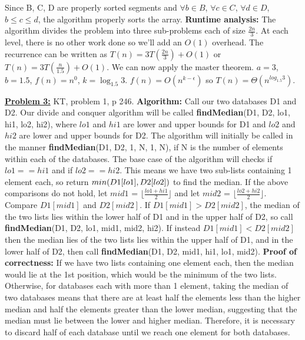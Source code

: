 \documentclass[11pt]{article}
\begin{document}
\begin{flushleft}
		\newline
		Since B, C, D are properly sorted segments and $\forall b \in B$, $\forall c \in C$, $\forall d \in D$, $b \leq c \leq d$, the algorithm properly sorts the array.
		\newline
		\textbf{Runtime analysis:} The algorithm divides the problem into three sub-problems each of size $\frac{2n}{3}$. At each level, there is no other work done so we'll add an $O(1)$ overhead. The recurrence can be written as $T(n) = 3T(\frac{2n}{3}) + O(1)$ or $T(n) = 3T(\frac{n}{1.5}) + O(1)$. We can now apply the master theorem. $a = 3$, $b = 1.5$, $f(n) = n^0$, $k = \log_{1.5}3$. $f(n) = O(n^{k - \epsilon})$ so $T(n) = \Theta(n^{log_{1.5}3})$.
		\newline
		\item \textbf {\underline{Problem 3:}} KT, problem 1, p 246.
		\newline
		\textbf{Algorithm:} Call our two databases D1 and D2. Our divide and conquer algorithm will be called \textbf{findMedian}(D1, D2, lo1, hi1, lo2, hi2), where $lo1$ and $hi1$ are lower and upper bounds for D1 and $lo2$ and $hi2$ are lower and upper bounds for D2. The algorithm will initially be called in the manner \textbf{findMedian}(D1, D2, 1, N, 1, N), if N is the number of elements within each of the databases. The base case of the algorithm will checks if $lo1 == hi1$ and if $lo2 == hi2$. This means we have two sub-lists containing 1 element each, so return $min(D1[lo1],\space D2[lo2])$ to find the median.
		\newline
		If the above comparisons do not hold, let $mid1$ = $\lfloor \frac{lo1 + hi1}{2} \rfloor$
		and let $mid2$ = $\lfloor \frac{lo2 + hi2}{2} \rfloor$. Compare $D1[mid1]$ and $D2[mid2]$. If $D1[mid1] > D2[mid2]$, the median of the two lists lies within the lower half of D1 and in the upper half of D2, so call 
		\textbf{findMedian}(D1, D2, lo1, mid1, mid2, hi2). 
		\newline
		If instead $D1[mid1] < D2[mid2]$ then the median lies of the two lists lies within the upper half of D1, and in the lower half of D2, then call \textbf{findMedian}(D1, D2, mid1, hi1, lo1, mid2). 
		\newline
		\newline
		\textbf{Proof of correctness:} If we have two lists containing one element each, then the median would lie at the 1st position, which would be the minimum of the two lists. Otherwise, for databases each with more than 1 element, taking the median of two databases means that there are at least half the elements less than the higher median and half the elements greater than the lower median, suggesting that the median must lie between the lower and higher median. Therefore, it is necessary to discard half of each database until we reach one element for both databases. 

\end{flushleft}
\end{document}

